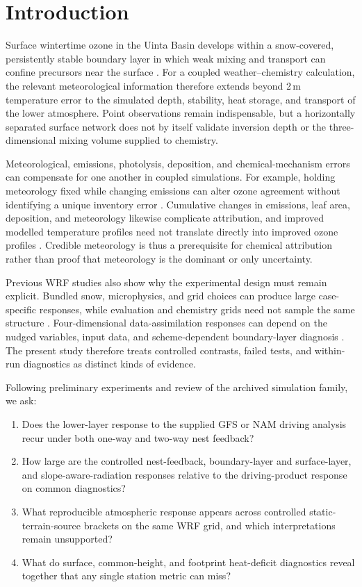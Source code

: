 \documentclass[air,article,submit,moreauthors]{Definitions/mdpi}
\begin{document}
\section{Introduction}
\label{sec:v3-introduction}

Surface wintertime ozone in the Uinta Basin develops within a snow-covered, persistently stable boundary layer in which weak mixing and transport can confine precursors near the surface \citep{Ahmadov2015-zm,Neemann2015-ws,Davies2025-wy}.
For a coupled weather--chemistry calculation, the relevant meteorological information therefore extends beyond 2\,m temperature error to the simulated depth, stability, heat storage, and transport of the lower atmosphere.
Point observations remain indispensable, but a horizontally separated surface network does not by itself validate inversion depth or the three-dimensional mixing volume supplied to chemistry.

Meteorological, emissions, photolysis, deposition, and chemical-mechanism errors can compensate for one another in coupled simulations.
For example, holding meteorology fixed while changing emissions can alter ozone agreement without identifying a unique inventory error \citep{Ahmadov2015-zm}.
Cumulative changes in emissions, leaf area, deposition, and meteorology likewise complicate attribution, and improved modelled temperature profiles need not translate directly into improved ozone profiles \citep{Matichuk2017-bq}.
Credible meteorology is thus a prerequisite for chemical attribution rather than proof that meteorology is the dominant or only uncertainty.

Previous WRF studies also show why the experimental design must remain explicit.
Bundled snow, microphysics, and grid choices can produce large case-specific responses, while evaluation and chemistry grids need not sample the same structure \citep{Neemann2015-ws}.
Four-dimensional data-assimilation responses can depend on the nudged variables, input data, and scheme-dependent boundary-layer diagnosis \citep{Tran2018-ax}.
The present study therefore treats controlled contrasts, failed tests, and within-run diagnostics as distinct kinds of evidence.

Following preliminary experiments and review of the archived simulation family, we ask:

\begin{enumerate}
  \item Does the lower-layer response to the supplied GFS or NAM driving analysis recur under both one-way and two-way nest feedback?
  \item How large are the controlled nest-feedback, boundary-layer and surface-layer, and slope-aware-radiation responses relative to the driving-product response on common diagnostics?
  \item What reproducible atmospheric response appears across controlled static-terrain-source brackets on the same WRF grid, and which interpretations remain unsupported?
  \item What do surface, common-height, and footprint heat-deficit diagnostics reveal together that any single station metric can miss?
\end{enumerate}
\end{document}
